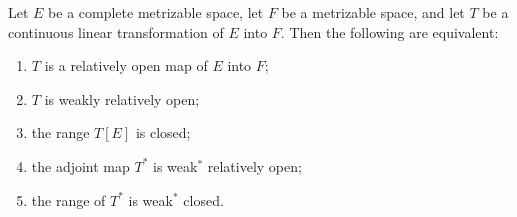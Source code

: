 Let $E$ be a complete metrizable space, let $F$ be a metrizable space, and let $T$ be a continuous linear transformation of $E$ into $F$. Then the following are equivalent:
\begin{enumerate}
  \item[(i)] $T$ is a relatively open map of $E$ into $F$;
  \item[(ii)] $T$ is weakly relatively open;
  \item[(iii)] the range $T[E]$ is closed;
  \item[(iv)] the adjoint map $T^*$ is weak$^*$ relatively open;
  \item[(v)] the range of $T^*$ is weak$^*$ closed.
\end{enumerate}
